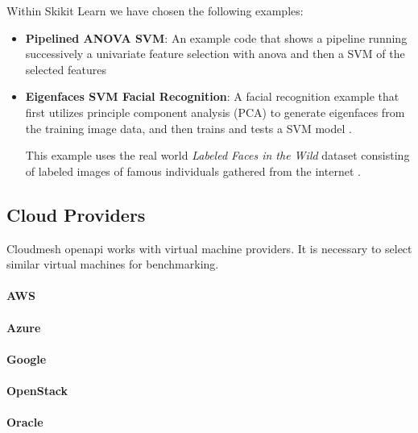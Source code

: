 Within Skikit Learn we have chosen the following examples:

\begin{itemize}
\item
  \textbf{Pipelined ANOVA SVM}: An example code that shows a pipeline
  running successively a univariate feature selection with anova and
  then a SVM of the selected features \cite{www-skikit-learn-pipeline,}
\item
  \textbf{Eigenfaces SVM Facial Recognition}: A facial recognition
  example that first utilizes principle component analysis (PCA) to
  generate eigenfaces from the training image data, and then trains and
  tests a SVM model \cite{www-skikit-learn-faces}.

  This example uses the real world {\em Labeled Faces in the Wild} dataset
  consisting of labeled images of famous individuals gathered from the
  internet \cite{faces-data}.

\end{itemize}

\subsection{Cloud Providers}\label{cloud-providers}

Cloudmesh openapi works with virtual machine providers. It is necessary
to select similar virtual machines for benchmarking.

\hypertarget{aws}{%
\paragraph{AWS}\label{aws}}

\hypertarget{azure}{%
\paragraph{Azure}\label{azure}}

\hypertarget{google}{%
\paragraph{Google}\label{google}}

\hypertarget{openstack}{%
\paragraph{OpenStack}\label{openstack}}

\hypertarget{oracle}{%
\paragraph{Oracle}\label{oracle}}

